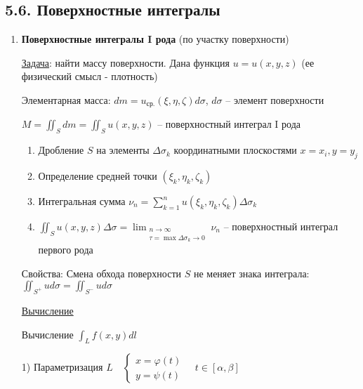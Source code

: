 \documentclass[12pt]{article}
\begin{document}
    \subsection{5.6. Поверхностные интегралы}

    \hypertarget{surfaceintegraloffirstkind}{}

    \begin{enumerate}[label*=\textbf{\arabic** }]
    \item \textbf{Поверхностные интегралы I рода} (по участку поверхности)

    \underline{Задача}: найти массу поверхности. Дана функция $u = u(x, y, z)$ (ее физический смысл - плотность)

    Элементарная масса: $dm = u_{\text{ср.}}(\xi, \eta, \zeta) d\sigma$, $d\sigma$ -- элемент поверхности

    $M = \iint_S dm = \iint_S u(x, y, z)$ -- поверхностный интеграл I рода

    \begin{enumerate}
        \item Дробление $S$ на элементы $\Delta \sigma_k$ координатными плоскостями $x = x_i, y = y_j$

        \item Определение средней точки $(\xi_k, \eta_k, \zeta_k)$

        \item Интегральная сумма $\nu_n = \sum_{k = 1}^{n} u(\xi_k, \eta_k, \zeta_k) \Delta \sigma_k$

        \item \Defs $\iint_S u(x, y, z) \Delta \sigma = \lim_{\substack{n \to \infty \\ \tau = \max \Delta \sigma_k \to 0}} \nu_n$ -- поверхностный интеграл первого рода
    \end{enumerate}

    \hypertarget{surfaceintegraloffirstkindproperties}{}

    Свойства: Смена обхода поверхности $S$ не меняет знака интеграла: $\iint_{S^+} u d\sigma = \iint_{S^-} u d\sigma$

    \mediumvspace


    \underline{Вычисление}

    \Mems Вычисление $\int_L f(x, y) dl$

    1) Параметризация $L \quad \begin{cases}x = \varphi(t) \\ y = \psi(t)\end{cases} \quad t \in [\alpha, \beta]$


\end{enumerate}
\end{document}
